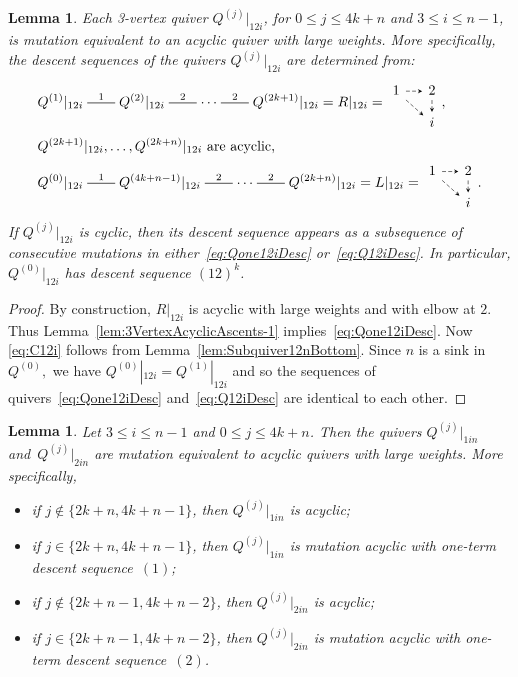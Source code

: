 \documentclass[11pt, letterpaper]{amsart}
\newtheorem{lemma}[theorem]{Lemma}
\theoremstyle{definition}
\numberwithin{equation}{section}
\newcommand{\mutation}[1]{\stackrel{#1}{\rule[.5ex]{2em}{0.5pt}}}
\begin{document}
\begin{lemma}
\label{lem:Q12iSubquiv}
Each 3-vertex quiver $Q^{(j)}|_{12i}$, for $0\le j\le 4k+n$ and $3 \le i \le n-1$, is mutation equivalent to an acyclic quiver with large weights. 
More specifically, the descent sequences of the quivers $Q^{(j)}|_{12i}$ are determined from:
\begin{align}
\label{eq:Qone12iDesc}
& Q^{(1)}|_{12i} \mutation{1} Q^{(2)}|_{12i} \mutation{2} \cdots \mutation{2} Q^{(2k+1)}|_{12i} = R|_{12i}= 
\begin{tikzcd}[arrows={-stealth}, sep=small, ampersand replacement=\&]
  1 \arrow[r, dashed] \arrow[rd, dashed]
  \& 2 \arrow[d, dashed]
  \\
   \& i
\end{tikzcd},
\\
\label{eq:C12i}
& \text{$Q^{(2k+1)}|_{12i}, \ldots, Q^{(2k+n)}|_{12i}$ are acyclic,} 
\\
\label{eq:Q12iDesc}
& Q^{(0)}|_{12i} \mutation{1} Q^{(4k+n-1)}|_{12i} \mutation{2} \cdots \mutation{2} Q^{(2k+n)}|_{12i} = L|_{12i}= 
\begin{tikzcd}[arrows={-stealth}, sep=small, ampersand replacement=\&]
  1 \arrow[r, dashed] \arrow[rd, dashed]
  \& 2 \arrow[d, dashed]
  \\
   \& i
\end{tikzcd}.
\end{align}
If $Q^{(j)}|_{12i}$ is cyclic, then its descent sequence appears as a subsequence of consecutive mutations in either~\eqref{eq:Qone12iDesc} or~\eqref{eq:Q12iDesc}.
In particular, $Q^{(0)}|_{12i}$ has descent sequence $(12)^{k}$.
\end{lemma}

\begin{proof}
By construction, $R|_{12i}$ is acyclic with large weights and with elbow at $2$. %
Thus Lemma~\ref{lem:3VertexAcyclicAscents-1} implies~\eqref{eq:Qone12iDesc}.
Now \eqref{eq:C12i} follows from Lemma~\ref{lem:Subquiver12nBottom}. 
Since $n$ is a sink in $Q^{(0)},$ we have $Q^{(0)}|_{12i} = Q^{(1)}|_{12i}$ and so the sequences of quivers~\eqref{eq:Qone12iDesc} and~\eqref{eq:Q12iDesc} are identical to each other.
\end{proof}


\begin{lemma}
\label{lem:Q1inOr2inSubquiv}
Let $3\!\le i \!\le\! n-1$ and $0\!\le\! j\!\le\! 4k+n$. 
Then the quivers $Q^{(j)}|_{1in}$ and~$Q^{(j)}|_{2in}$ are mutation equivalent to acyclic quivers with large weights. 
More specifically, 
\begin{itemize}[leftmargin=.2in]
\item
if $j\notin \{2k+n,4k+n-1\}$, then $Q^{(j)}|_{1in}$ is acyclic; 
\item
if $j\!\in\! \{2k+n,4k+n-1\}$, then $Q^{(j)}|_{1in}$ is mutation acyclic with one-term descent sequence~$(1)$;
\item
if $j\notin \{2k+n-1,4k+n-2\}$, then $Q^{(j)}|_{2in}$ is acyclic; 
\item
if $j\in \{2k+n-1,4k+n-2\}$, then $Q^{(j)}|_{2in}$  is mutation acyclic with one-term descent sequence~$(2)$. 
\end{itemize}
\end{lemma}
\end{document}

